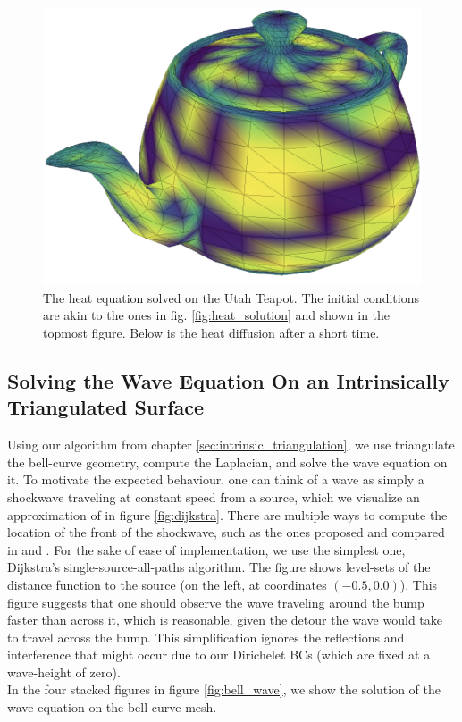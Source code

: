 \begin{figure}
    \includegraphics[width=0.9\columnwidth]{../images/teapot_smoothed.png}\vspace*{3mm}
    \caption{The heat equation solved on the Utah Teapot. The initial conditions are akin to the ones in fig. \ref{fig:heat_solution} and shown in the topmost figure. Below is the heat diffusion after a short time.}
    \label{fig:teapot_heat_solution}
\end{figure}

\subsection*{Solving the Wave Equation On an Intrinsically Triangulated Surface}
Using our algorithm from chapter \ref{sec:intrinsic_triangulation}, we use triangulate the bell-curve geometry, compute the Laplacian, and solve the wave equation on it. To motivate the expected behaviour, one can think of a wave as simply a shockwave traveling at constant speed from a source, which we visualize an approximation of in figure \ref{fig:dijkstra}. There are multiple ways to compute the location of the front of the shockwave, such as the ones proposed and compared in \cite{vector_dijkstra} and \cite{heat_method}. For the sake of ease of implementation, we use the simplest one, Dijkstra's single-source-all-paths algorithm. The figure shows level-sets of the distance function to the source (on the left, at coordinates $(-0.5, 0.0)$). This figure suggests that one should observe the wave traveling around the bump faster than across it, which is reasonable, given the detour the wave would take to travel across the bump.
This simplification ignores the reflections and interference that might occur due to our Dirichelet BCs (which are fixed at a wave-height of zero).
\\
In the four stacked figures in figure \ref{fig:bell_wave}, we show the solution of the wave equation on the bell-curve mesh.
\label{fig:bell_wave}

